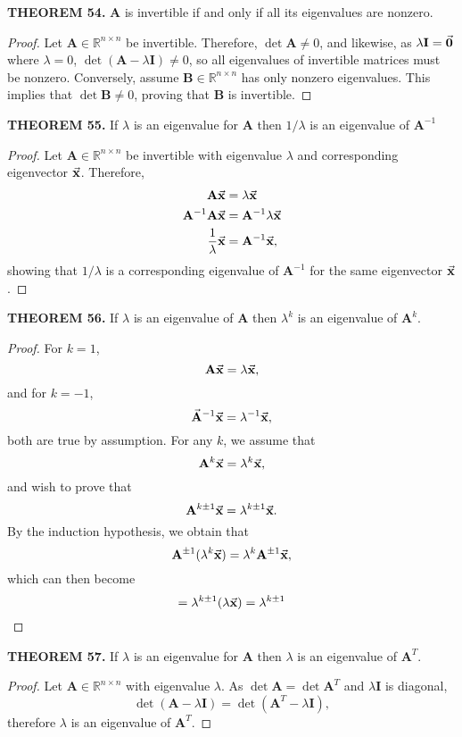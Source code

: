 \documentclass[12pt]{article}
\newcommand{\mat}[1]{\mathbf{#1}}
\newcommand{\theorem}[2]{\textbf{THEOREM #1.} #2}
\begin{document}
\theorem{54}{$\mat{A}$ is invertible if and only if all its eigenvalues are nonzero.}

\begin{proof}
Let $\mat{A} \in \mathbb{R}^{n \times n}$ be invertible. Therefore, $\det \mat{A} \ne 0$, and likewise, as $\lambda \mat{I} = \va{0}$ where $\lambda = 0$, $\det(\mat{A} - \lambda \mat{I}) \ne 0$, so all eigenvalues of invertible matrices must be nonzero. Conversely, assume $\mat{B} \in \mathbb{R}^{n \times n}$ has only nonzero eigenvalues. This implies that $\det \mat{B} \ne 0$, proving that $\mat{B}$ is invertible. 
\end{proof}

\theorem{55}{If $\lambda$ is an eigenvalue for $\mat{A}$ then $1/\lambda$ is an eigenvalue of $\mat{A}^{-1}$}

\begin{proof}
    Let $\mat{A} \in \mathbb{R}^{n \times n}$ be invertible with eigenvalue $\lambda$ and corresponding eigenvector $\va{x}$. Therefore,
\begin{align*}
  \mat{A} \va{x} &= \lambda \va{x} \\
  \mat{A}^{-1} \mat{A} \va{x} &= \mat{A}^{-1} \lambda \va{x} \\
  \frac{1}{\lambda} \va{x} &= \mat{A}^{-1} \va{x},
\end{align*}
showing that $1/\lambda$ is a corresponding eigenvalue of $\mat{A}^{-1}$ for the same eigenvector $\va{x}$.
\end{proof}

\theorem{56}{If $\lambda$ is an eigenvalue of $\mat{A}$ then $\lambda^{k}$ is an eigenvalue of $\mat{A}^{k}$.}

\begin{proof}
For $k=1$,
$$\mat{A}\va{x} = \lambda \va{x},$$ 
and for $k=-1$, 
$$\va{A}^{-1} \va{x} = \lambda^{-1} \va{x},$$
both are true by assumption. For any $k$, we assume that
$$\mat{A}^{k} \va{x} = \lambda^{k} \va{x},$$ 
and wish to prove that
$$\mat{A}^{k \pm 1} \va{x} = \lambda^{k \pm 1} \va{x}.$$
By the induction hypothesis, we obtain that
$$\mat{A}^{\pm 1}(\lambda^{k} \va{x}) = \lambda^{k} \mat{A}^{\pm 1} \va{x},$$
which can then become
$$= \lambda^{k \pm 1}(\lambda \va{x}) = \lambda^{k \pm 1}$$ 
\end{proof}

\theorem{57}{If $\lambda$ is an eigenvalue for $\mat{A}$ then $\lambda$ is an eigenvalue of $\mat{A}^{T}$.}

\begin{proof}
Let $\mat{A} \in \mathbb{R}^{n \times n}$ with eigenvalue $\lambda$. As $\det \mat{A} = \det \mat{A}^{T}$ and $\lambda \mat{I}$ is diagonal,
$$\det(\mat{A} - \lambda \mat{I}) = \det(\mat{A}^{T} - \lambda \mat{I}),$$
therefore $\lambda$ is an eigenvalue of $\mat{A}^{T}$.
\end{proof}
\end{document}
